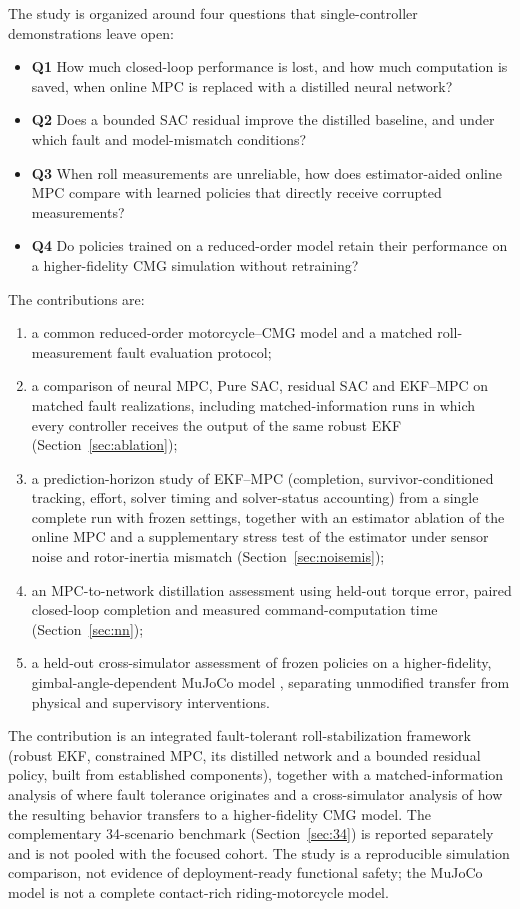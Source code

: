 \documentclass[preprint,12pt,authoryear=false]{elsarticle}
\theoremstyle{remark}\newtheorem{remark}{Remark}
\theoremstyle{plain}\newtheorem{proposition}{Proposition}\newtheorem{lemma}{Lemma}
\theoremstyle{definition}\newtheorem{assumption}{Assumption}
\begin{document}
The study is organized around four questions that single-controller demonstrations leave open:
\begin{itemize}
\item \textbf{Q1} How much closed-loop performance is lost, and how much computation is saved, when online MPC is replaced with a distilled neural network?
\item \textbf{Q2} Does a bounded SAC residual improve the distilled baseline, and under which fault and model-mismatch conditions?
\item \textbf{Q3} When roll measurements are unreliable, how does estimator-aided online MPC compare with learned policies that directly receive corrupted measurements?
\item \textbf{Q4} Do policies trained on a reduced-order model retain their performance on a higher-fidelity CMG simulation without retraining?
\end{itemize}
The contributions are:
\begin{enumerate}
\item a common reduced-order motorcycle--CMG model and a matched roll-measurement fault evaluation protocol;
\item a comparison of neural MPC, Pure SAC, residual SAC and EKF--MPC on matched fault realizations, including matched-information runs in which every controller receives the output of the same robust EKF (Section~\ref{sec:ablation});
\item a prediction-horizon study of EKF--MPC (completion, survivor-conditioned tracking, effort, solver timing and solver-status accounting) from a single complete run with frozen settings, together with an estimator ablation of the online MPC and a supplementary stress test of the estimator under sensor noise and rotor-inertia mismatch (Section~\ref{sec:noisemis});
\item an MPC-to-network distillation assessment using held-out torque error, paired closed-loop completion and measured command-computation time (Section~\ref{sec:nn});
\item a held-out cross-simulator assessment of frozen policies on a higher-fidelity, gimbal-angle-dependent MuJoCo model \cite{todorov2012mujoco}, separating unmodified transfer from physical and supervisory interventions.
\end{enumerate}
The contribution is an integrated fault-tolerant roll-stabilization framework (robust EKF, constrained MPC, its distilled network and a bounded residual policy, built from established components), together with a matched-information analysis of where fault tolerance originates and a cross-simulator analysis of how the resulting behavior transfers to a higher-fidelity CMG model. The complementary 34-scenario benchmark (Section~\ref{sec:34}) is reported separately and is not pooled with the focused cohort. The study is a reproducible simulation comparison, not evidence of deployment-ready functional safety; the MuJoCo model is not a complete contact-rich riding-motorcycle model.
\end{document}
